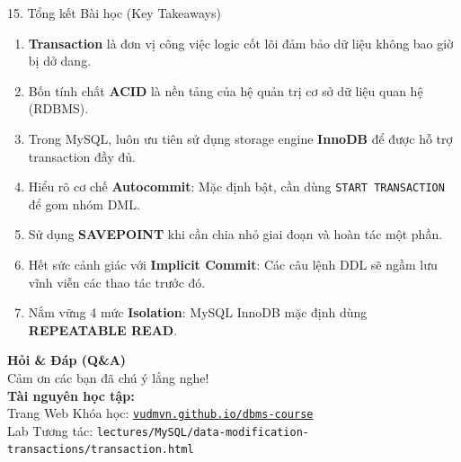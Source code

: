 \documentclass[aspectratio=169,11pt]{beamer}
\newcommand{\code}[1]{\texttt{#1}}
\begin{document}
\begin{frame}{15. Tổng kết Bài học (Key Takeaways)}
  \begin{enumerate}
    \item \textbf{Transaction} là đơn vị công việc logic cốt lõi đảm bảo dữ liệu không bao giờ bị dở dang.
    \item Bốn tính chất \textbf{ACID} là nền tảng của hệ quản trị cơ sở dữ liệu quan hệ (RDBMS).
    \item Trong MySQL, luôn ưu tiên sử dụng storage engine \textbf{InnoDB} để được hỗ trợ transaction đầy đủ.
    \item Hiểu rõ cơ chế \textbf{Autocommit}: Mặc định bật, cần dùng \code{START TRANSACTION} để gom nhóm DML.
    \item Sử dụng \textbf{SAVEPOINT} khi cần chia nhỏ giai đoạn và hoàn tác một phần.
    \item Hết sức cảnh giác với \textbf{Implicit Commit}: Các câu lệnh DDL sẽ ngầm lưu vĩnh viễn các thao tác trước đó.
    \item Nắm vững 4 mức \textbf{Isolation}: MySQL InnoDB mặc định dùng \textbf{REPEATABLE READ}.
  \end{enumerate}
\end{frame}

\begin{frame}
  \begin{center}
    \vspace{1.5em}
    {\huge \textcolor{dbblue}{\textbf{Hỏi \& Đáp (Q\&A)}}}\\[1.2em]
    {\large Cảm ơn các bạn đã chú ý lắng nghe!}\\[1.5em]
    \textbf{Tài nguyên học tập:}\\[0.5em]
    Trang Web Khóa học: \href{https://vudmvn.github.io/dbms-course}{\code{vudmvn.github.io/dbms-course}}\\[0.3em]
    Lab Tương tác: \code{lectures/MySQL/data-modification-transactions/transaction.html}
  \end{center}
\end{frame}
\end{document}
